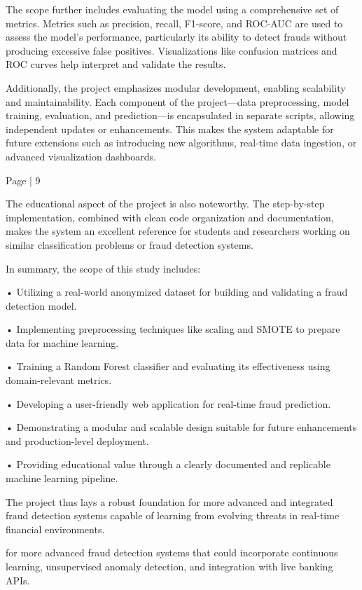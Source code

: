 \documentclass[11pt,a4paper]{article}
\begin{document}
The scope further includes evaluating the model using a comprehensive set of metrics. Metrics such 
as precision, recall, F1-score, and ROC-AUC are used to assess the model's performance, particularly 
its ability to detect frauds without producing excessive false positives. Visualizations like confusion 
matrices and ROC curves help interpret and validate the results. 

Additionally, the project emphasizes modular development, enabling scalability and maintainability. 
Each component of the project—data preprocessing, model training, evaluation, and prediction—is 
encapsulated in separate scripts, allowing independent updates or enhancements. This makes the 
system adaptable for future extensions such as introducing new algorithms, real-time data ingestion, 
or advanced visualization dashboards. 

Page | 9  

\newpage

The educational aspect of the project is also noteworthy. The step-by-step implementation, combined 
with clean code organization and documentation, makes the system an excellent reference for students 
and researchers working on similar classification problems or fraud detection systems. 

In summary, the scope of this study includes: 

• 
Utilizing a real-world anonymized dataset for building and validating a fraud detection model. 

• 
Implementing preprocessing techniques like scaling and SMOTE to prepare data for machine 
learning. 

• 
Training a Random Forest classifier and evaluating its effectiveness using domain-relevant 
metrics. 

• 
Developing a user-friendly web application for real-time fraud prediction. 

• 
Demonstrating a modular and scalable design suitable for future enhancements and 
production-level deployment. 

• 
Providing educational value through a clearly documented and replicable machine learning 
pipeline. 

The project thus lays a robust foundation for more advanced and integrated fraud detection systems 
capable of learning from evolving threats in real-time financial environments. 

for more advanced fraud detection systems that could incorporate continuous learning, unsupervised 
anomaly detection, and integration with live banking APIs. 
\end{document}
